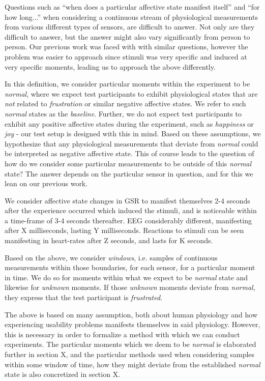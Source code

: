 Questions such as ``when does a particular affective state manifest itself'' and ``for how long...'' when considering a
continuous stream of physiological measurements from various different types of sensors, are difficult to answer. Not
only are they difficult to answer, but the answer might also vary significantly from person to person. Our previous work
was faced with with similar questions, however the problem was easier to approach since stimuli was very specific and
induced at very specific moments, leading us to approach the above differently.

In this definition, we consider particular moments within the experiment to be \textit{normal}, where we expect test
participants to exhibit physiological states that are \textit{not} related to \textit{frustration} or similar negative
affective states. We refer to such \textit{normal} states as the \textit{baseline}. Further, we do not expect test
participants to exhibit any positive affective states during the experiment, such as \textit{happiness} or \textit{joy}
- our test setup is designed with this in mind. Based on these assumptions, we hypothesize that any physiological
measurements that deviate from \textit{normal} could be interpreted as negative affective state. This of course leads to
the question of how do we consider some particular measurements to be outside of this \textit{normal} state? The answer
depends on the particular sensor in question, and for this we lean on our previous work.

We consider affective state changes in GSR to manifest themselves 2-4 seconds after the experience occurred which
induced the stimuli, and is noticeable within a time-frame of 3-4 seconds thereafter. EEG considerably different,
manifesting after X milliseconds, lasting Y milliseconds. Reactions to stimuli can be seen manifesting in heart-rates
after Z seconds, and lasts for K seconds. 

Based on the above, we consider \textit{windows}, i.e. samples of continuous measurements within those boundaries, for
each sensor, for a particular moment in time. We do so for moments within what we expect to be \textit{normal} state and
likewise for \textit{unknown} moments. If those \textit{unknown} moments deviate from \textit{normal}, they express that
the test participant is \textit{frustrated}.

The above is based on many assumption, both about human physiology and how experiencing usability problems manifests
themselves in said physiology. However, this is necessary in order to formalize a method with which we can conduct
experiments. The particular moments which we deem to be \textit{normal} is elaborated further in section X, and the
particular methods used when considering samples within some window of time, how they might deviate from the established
\textit{normal} state is also concretized in section X.



